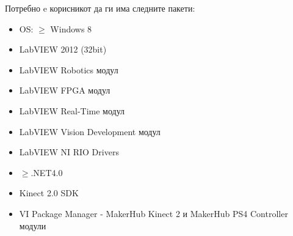 \documentclass[12pt]{article}
\begin{document}
    Потребно e корисникот да ги има следните пакети:
    \begin{itemize}
      \item OS: $\geq$ Windows 8
      \item LabVIEW 2012 (32bit)
      \item LabVIEW Robotics модул
      \item LabVIEW FPGA модул
      \item LabVIEW Real-Time модул
      \item LabVIEW Vision Development модул
      \item LabVIEW NI RIO Drivers
      \item $\geq$.NET4.0
      \item Kinect 2.0 SDK
      \item VI Package Manager - MakerHub Kinect 2 и MakerHub PS4 Controller модули
      \end{itemize}

\medskip
\nocite{*}
\newpage
\printbibliography[heading=bibintoc,title={Користена литература}]
\end{document}
